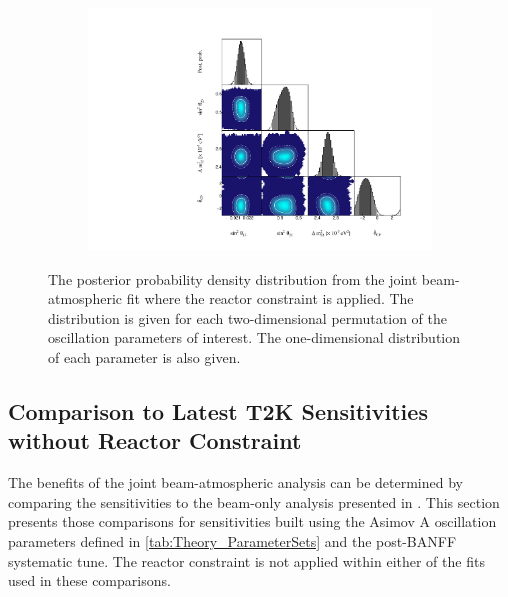 \begin{figure}[h]
  \begin{subfigure}[t]{\textwidth}
    \includegraphics[width=\textwidth, trim={0mm 0mm 0mm 0mm}, clip,page=1]{Figures/OA/JointFit_wRC/Contours_1D_wRC_UnSmeared_CredibleInterval_TrianglePlot.pdf}
  \end{subfigure}
  \caption{The posterior probability density distribution from the joint beam-atmospheric fit where the reactor constraint is applied. The distribution is given for each two-dimensional permutation of the oscillation parameters of interest. The one-dimensional distribution of each parameter is also given.}
  \label{fig:OscillationAnalysis_JointFit_wRC_TrianglePlot}
\end{figure}

\clearpage
\subsection{Comparison to Latest T2K Sensitivities without Reactor Constraint}
\label{sec:OscillationAnalysis_JointFit_OA2020}

The benefits of the joint beam-atmospheric analysis can be determined by comparing the sensitivities to the beam-only analysis presented in \cite{Dunne2020-uf, t2k_tn_393}. This section presents those comparisons for sensitivities built using the Asimov A oscillation parameters defined in \autoref{tab:Theory_ParameterSets} and the post-BANFF systematic tune. The reactor constraint is not applied within either of the fits used in these comparisons.

